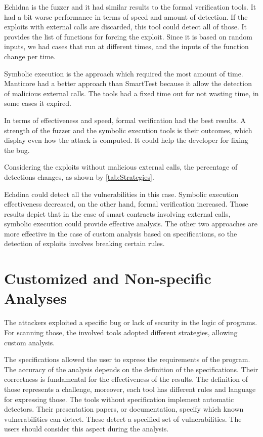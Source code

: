 Echidna is the fuzzer and it had similar results to the formal verification tools. 
It had a bit worse performance in terms of speed and amount of detection. If the exploits with external calls are discarded, this tool could detect all of those. 
It provides the list of functions for forcing the exploit. Since it is based on random inputs, we had cases that run at different times, and the inputs of the function change per time. 

Symbolic execution is the approach which required the most amount of time. Manticore had a better approach than SmartTest because it allow the detection of malicious external calls. 
The tools had a fixed time out for not wasting time, in some cases it expired. 

In terms of effectiveness and speed, formal verification had the best results.
A strength of the fuzzer and the symbolic execution tools is their outcomes, which display even how the attack is computed. It could help the developer for fixing the bug.

Considering the exploits without malicious external calls, the percentage of detections changes, as shown by \autoref{tab:Strategies}.

Echdina could detect all the vulnerabilities in this case. 
Symbolic execution effectiveness decreased, on the other hand, formal verification increased. 
Those results depict that in the case of smart contracts involving external calls, symbolic execution could provide effective analysis.
The other two approaches are more effective in the case of custom analysis based on specifications, so the detection of exploits involves breaking certain rules. 


\section{Customized and Non-specific Analyses} 
The attackers exploited a specific bug or lack of security in the logic of programs. For scanning those, the involved tools adopted different strategies, allowing custom analysis. 

The specifications allowed the user to express the requirements of the program. The accuracy of the analysis depends on the definition of the specifications. 
Their correctness is fundamental for the effectiveness of the results. 
The definition of those represents a challenge, moreover, each tool has different rules and language for expressing those.
The tools without specification implement automatic detectors. 
Their presentation papers, or documentation, specify which known vulnerabilities can detect. These detect a specified set of vulnerabilities. 
The users should consider this aspect during the analysis. 

